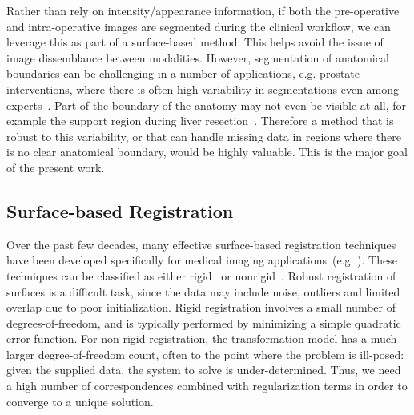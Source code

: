 \documentclass[journal]{IEEEtran}
\begin{document}
Rather than rely on intensity/appearance information, if both the pre-operative and intra-operative images are segmented during the clinical workflow, we can leverage this as part of a surface-based method.  This helps avoid the issue of image dissemblance between modalities. However, segmentation of anatomical boundaries can be challenging in a number of applications, e.g. prostate interventions, where there is often high variability in segmentations even among experts~\cite{Smith07a}. Part of the boundary of the anatomy may not even be visible at all, for example the support region during liver resection~\cite{Cash05a,Rucker14a}. Therefore a method that is robust to this variability, or that can handle missing data in regions where there is no clear anatomical boundary, would be highly valuable.  This is the major goal of the present work.

\subsection{Surface-based Registration}

Over the past few decades, many effective surface-based registration techniques have been developed specifically for medical imaging applications~(e.g. \cite{Besl92a,Brown07a,Chui03a,Huang07a,Jian11a,Myronenko10a,Wand09a}). These techniques can be classified as either rigid~\cite{Besl92a} or nonrigid~\cite{Brown07a,Chui03a,Huang07a,Masutani01a,Myronenko10a,Wand09a}. Robust registration of surfaces is a difficult task, since the data may include noise, outliers and limited overlap due to poor initialization. Rigid registration involves a small number of degrees-of-freedom, and is typically performed by minimizing a simple quadratic error function.  For non-rigid registration, the transformation model has a much larger degree-of-freedom count, often to the point where the problem is ill-posed: given the supplied data, the system to solve is under-determined.  Thus, we need a high number of correspondences combined with regularization terms in order to converge to a unique solution.
\end{document}
